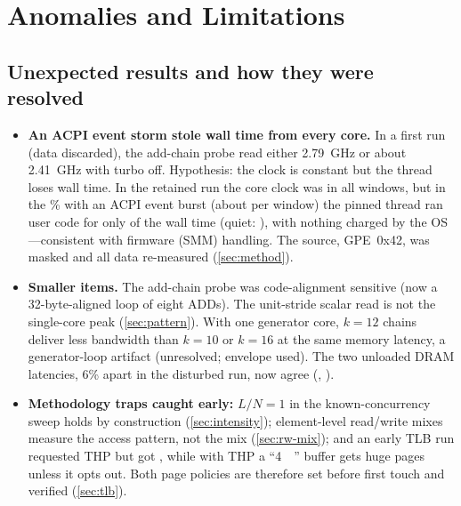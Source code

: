\section{Anomalies and Limitations}\label{sec:anomalies}

\subsection{Unexpected results and how they were resolved}
\begin{itemize}[nosep, leftmargin=*]
  \item \textbf{An ACPI event storm stole wall time from every core.} In a first run (data discarded), the
        add-chain probe read either \qty{2.79}{\giga\hertz} or about \qty{2.41}{\giga\hertz} with turbo off.
        Hypothesis: the clock is constant but the thread loses wall time. In the retained 
        run the core clock was  in all  windows,
        but in the \% with an ACPI event burst (about  per
        window) the pinned thread ran user code for only  of the wall time (quiet:
        ), with nothing charged by the OS---consistent with firmware (SMM)
        handling. The source, GPE~0x42, was masked and all data re-measured (\cref{sec:method}).
  \item \textbf{Smaller items.} The add-chain probe was code-alignment sensitive (now a 32-byte-aligned
        loop of eight ADDs). The unit-stride scalar read is not the single-core peak (\cref{sec:pattern}).
        With one generator core, $k=12$ chains deliver less bandwidth than $k=10$ or $k=16$ at the same
        memory latency, a generator-loop artifact (unresolved; envelope used). The two unloaded DRAM
        latencies, 6\% apart in the disturbed run, now agree (,
        ).
  \item \textbf{Methodology traps caught early:} $L/N=1$ in the known-concurrency sweep holds by
        construction (\cref{sec:intensity}); element-level read/write mixes measure the access pattern, not
        the mix (\cref{sec:rw-mix}); and an early TLB run requested THP but got ,
        while with THP \sysHugePages{} a ``\qty{4}{\kibi\byte}'' buffer gets huge pages unless it opts out.
        Both page policies are therefore set before first touch and verified (\cref{sec:tlb}).
\end{itemize}

